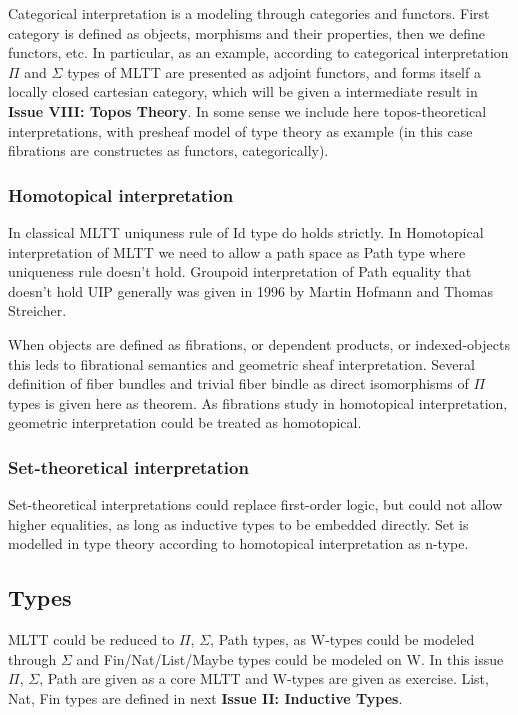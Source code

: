 \documentclass{article}
\theoremstyle{definition}
\begin{document}
Categorical interpretation\cite{Curien14} is a modeling through categories and functors.
First category is defined as objects, morphisms and their properties, then
we define functors, etc. In particular, as an example, according to categorical
interpretation $\Pi$ and $\Sigma$ types of MLTT are presented as adjoint
functors, and forms itself a locally closed cartesian category, which will be given a
intermediate result in {\bf Issue VIII: Topos Theory}. In some sense we include here
topos-theoretical interpretations, with presheaf model of type theory as
example (in this case fibrations are constructes as functors, categorically).

\subsubsection{Homotopical interpretation}

In classical MLTT uniquness rule of Id type do holds strictly. In Homotopical
interpretation of MLTT we need to allow a path space as Path type where uniqueness
rule doesn't hold. Groupoid interpretation of Path equality that doesn't hold UIP generally
was given in 1996 by Martin Hofmann and Thomas Streicher\cite{Hofmann96}.

When objects are defined as fibrations, or dependent products, or indexed-objects
this leds to fibrational semantics and geometric sheaf interpretation. Several definition
of fiber bundles and trivial fiber bindle as direct isomorphisms of $\Pi$ types is
given here as theorem. As fibrations study in homotopical interpretation, geometric
interpretation could be treated as homotopical.

\subsubsection{Set-theoretical interpretation}

Set-theoretical interpretations could replace first-order logic, but could not allow
higher equalities, as long as inductive types to be embedded directly. Set is modelled
in type theory according to homotopical interpretation as n-type.

\subsection{Types}

MLTT could be reduced to $\Pi$, $\Sigma$, Path types, as W-types could be
modeled through $\Sigma$ and Fin/Nat/List/Maybe types could be modeled on W.
In this issue $\Pi$, $\Sigma$, Path are given as a core MLTT and W-types
are given as exercise. List, Nat, Fin types are defined in next {\bf Issue II: Inductive Types}.
\end{document}

